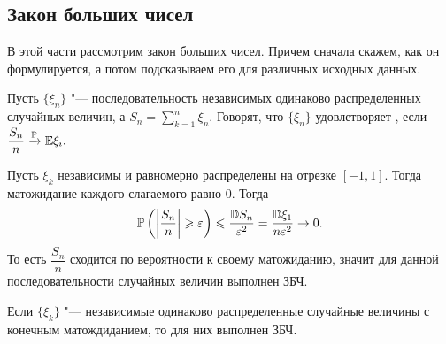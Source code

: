 \documentclass[../TV&MS.tex]{subfiles}
\begin{document}
\begin{center}
\end{center}


\subsection{Закон больших чисел}
	В этой части рассмотрим закон больших чисел. Причем сначала скажем, как он 
	формулируется, а потом подсказываем его для различных исходных данных.

\begin{Def}
    Пусть $\{\xi_n\}$ "--- последовательность независимых одинаково распределенных 
    случайных величин, а $S_n = \sum\limits_{k=1}^{n} \xi_n$. Говорят, что 
    $\{\xi_n\}$ удовлетворяет , если 
    $\dfrac{S_n}{n} \xrightarrow[]{\mathbb{P}} \mathbb{E} \xi_i.$ 
\end{Def} 

\begin{Ex}
    Пусть $\xi_k$ независимы и равномерно распределены на отрезке $[-1, 1]$. 
    Тогда матожидание каждого слагаемого равно $0$. Тогда
\[
    \mathbb{P} \left( \left| \dfrac{S_n}{n} \right| \geqslant \varepsilon \right) 
    \leqslant \dfrac{\mathbb{D} S_n}{\varepsilon^2} = 
    \dfrac{\mathbb{D} \xi_1}{n \varepsilon^2} \rightarrow 0. 
\]
    То есть $\dfrac{S_n}{n}$ сходится по вероятности к своему матожиданию, 
    значит для данной последовательности случайных величин выполнен ЗБЧ.
\end{Ex} 

\begin{Th}
    Если $\{ \xi_k \}$ "--- независимые одинаково распределенные случайные величины 
    с конечным матождиданием, то для них выполнен ЗБЧ. 
\end{Th} 
\end{document}
